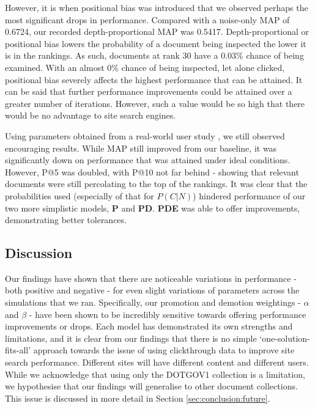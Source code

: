 However, it is when positional bias was introduced that we observed perhaps the most significant drops in performance. Compared with a noise-only MAP of 0.6724, our recorded depth-proportional MAP was 0.5417. Depth-proportional or positional bias lowers the probability of a document being inspected the lower it is in the rankings. As such, documents at rank 30 have a 0.03\% chance of being examined. With an almost 0\% chance of being inspected, let alone clicked, positional bias severely affects the highest performance that can be attained. It can be said that further performance improvements could be attained over a greater number of iterations. However, such a value would be so high that there would be no advantage to site search engines.

Using parameters obtained from a real-world user study \cite{smucker2012time_based_calibration}, we still observed encouraging results. While MAP still improved from our baseline, it was significantly down on performance that was attained under ideal conditions. However, P@5 was doubled, with P@10 not far behind - showing that relevant documents were still percolating to the top of the rankings. It was clear that the probabilities used (especially of that for $P(C|N)$) hindered performance of our two more simplistic models, \textbf{P} and \textbf{PD}. \textbf{PDE} was able to offer improvements, demonstrating better tolerances.

\subsection{Discussion}\label{sec:conclusion:discussion}
Our findings have shown that there are noticeable variations in performance - both positive and negative - for even slight variations of parameters across the simulations that we ran. Specifically, our promotion and demotion weightings - $\alpha$ and $\beta$ - have been shown to be incredibly sensitive towards offering performance improvements or drops. Each model has demonstrated its own strengths and limitations, and it is clear from our findings that there is no simple `one-solution-fits-all' approach towards the issue of using clickthrough data to improve site search performance. Different sites will have different content and different users. While we acknowledge that using only the DOTGOV1 collection is a limitation, we hypothesise that our findings will generalise to other document collections. This issue is discussed in more detail in Section \ref{sec:conclusion:future}.

